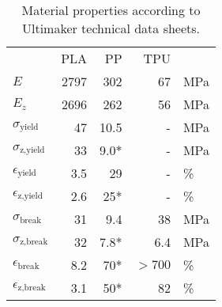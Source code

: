 
\begin{table}
	\centering
	\caption{Material properties according to Ultimaker technical data sheets. }
	\label{tab:mat_props}
	\begin{tabular}{lrrrl}
		& PLA & PP & TPU & \\
		$E$ & 2797 & 302 & 67 & \si{\mega\pascal} \\
		$E_z$ & 2696 & 262 & 56 & \si{\mega\pascal} \\
		$\sigma_\text{yield}$ & 47 & 10.5 & - & \si{\mega\pascal} \\
		$\sigma_\text{z,yield}$ & 33 & 9.0* & - & \si{\mega\pascal} \\
		$\epsilon_\text{yield}$ & 3.5 & 29 & - & \si{\percent} \\
		$\epsilon_\text{z,yield}$ & 2.6 & 25* & - & \si{\percent} \\
		$\sigma_\text{break}$ & 31 & 9.4 & 38 & \si{\mega\pascal} \\
		$\sigma_\text{z,break}$ & 32 & 7.8* & 6.4 & \si{\mega\pascal} \\
		$\epsilon_\text{break}$ & 8.2 & 70* & $>700$ & \si{\percent} \\
		$\epsilon_\text{z,break}$ & 3.1 & 50* & 82 & \si{\percent} \\
	\end{tabular}
\end{table}

